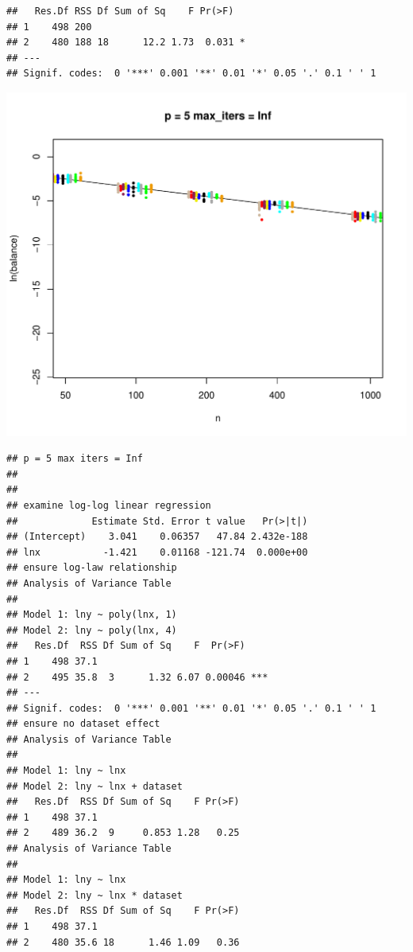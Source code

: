 \documentclass{article}\usepackage[]{graphicx}\usepackage[]{color}
\makeatletter
\def\maxwidth{ %
  \ifdim\Gin@nat@width>\linewidth
    \linewidth
  \else
    \Gin@nat@width
  \fi
}
\newenvironment{kframe}{%
 \def\at@end@of@kframe{}%
 \ifinner\ifhmode%
  \def\at@end@of@kframe{\end{minipage}}%
  \begin{minipage}{\columnwidth}%
 \fi\fi%
 \def\FrameCommand##1{\hskip\@totalleftmargin \hskip-\fboxsep
 \colorbox{shadecolor}{##1}\hskip-\fboxsep
     \hskip-\linewidth \hskip-\@totalleftmargin \hskip\columnwidth}%
 \MakeFramed {\advance\hsize-\width
   \@totalleftmargin\z@ \linewidth\hsize
   \@setminipage}}%
 {\par\unskip\endMakeFramed%
 \at@end@of@kframe}
\newenvironment{knitrout}{}{} %
\makeatother
\begin{document}
\begin{knitrout}
\begin{kframe}
\begin{verbatim}
##   Res.Df RSS Df Sum of Sq    F Pr(>F)  
## 1    498 200                           
## 2    480 188 18      12.2 1.73  0.031 *
## ---
## Signif. codes:  0 '***' 0.001 '**' 0.01 '*' 0.05 '.' 0.1 ' ' 1
\end{verbatim}
\end{kframe}
\includegraphics[width=\maxwidth]{figure/load_and_cleanup_data3} 
\begin{kframe}\begin{verbatim}
## p = 5 max iters = Inf 
## 
## 
## examine log-log linear regression
##             Estimate Std. Error t value   Pr(>|t|)
## (Intercept)    3.041    0.06357   47.84 2.432e-188
## lnx           -1.421    0.01168 -121.74  0.000e+00
## ensure log-law relationship
## Analysis of Variance Table
## 
## Model 1: lny ~ poly(lnx, 1)
## Model 2: lny ~ poly(lnx, 4)
##   Res.Df  RSS Df Sum of Sq    F  Pr(>F)    
## 1    498 37.1                              
## 2    495 35.8  3      1.32 6.07 0.00046 ***
## ---
## Signif. codes:  0 '***' 0.001 '**' 0.01 '*' 0.05 '.' 0.1 ' ' 1
## ensure no dataset effect
## Analysis of Variance Table
## 
## Model 1: lny ~ lnx
## Model 2: lny ~ lnx + dataset
##   Res.Df  RSS Df Sum of Sq    F Pr(>F)
## 1    498 37.1                         
## 2    489 36.2  9     0.853 1.28   0.25
## Analysis of Variance Table
## 
## Model 1: lny ~ lnx
## Model 2: lny ~ lnx * dataset
##   Res.Df  RSS Df Sum of Sq    F Pr(>F)
## 1    498 37.1                         
## 2    480 35.6 18      1.46 1.09   0.36
\end{verbatim}

\end{kframe}
\end{knitrout}
\end{document}

